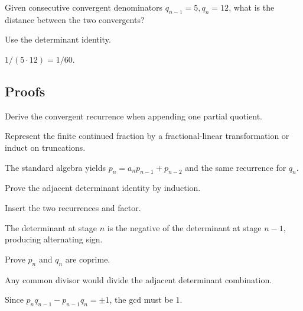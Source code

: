 \begin{exercise}\label{exr:ii25-expand-05}
Given consecutive convergent denominators \(q_{n-1}=5,q_n=12\), what is the distance between the two convergents?
\end{exercise}
\begin{hint}
Use the determinant identity.
\end{hint}
\begin{solution}
\(1/(5\cdot12)=1/60\).
\end{solution}

\subsection*{Proofs}

\begin{exercise}\label{exr:ii25-expand-06}
Derive the convergent recurrence when appending one partial quotient.
\end{exercise}
\begin{hint}
Represent the finite continued fraction by a fractional-linear transformation or induct on truncations.
\end{hint}
\begin{solution}
The standard algebra yields \(p_n=a_np_{n-1}+p_{n-2}\) and the same recurrence for \(q_n\).
\end{solution}

\begin{exercise}\label{exr:ii25-expand-07}
Prove the adjacent determinant identity by induction.
\end{exercise}
\begin{hint}
Insert the two recurrences and factor.
\end{hint}
\begin{solution}
The determinant at stage \(n\) is the negative of the determinant at stage \(n-1\), producing alternating sign.
\end{solution}

\begin{exercise}\label{exr:ii25-expand-08}
Prove \(p_n\) and \(q_n\) are coprime.
\end{exercise}
\begin{hint}
Any common divisor would divide the adjacent determinant combination.
\end{hint}
\begin{solution}
Since \(p_nq_{n-1}-p_{n-1}q_n=\pm1\), the gcd must be \(1\).
\end{solution}

